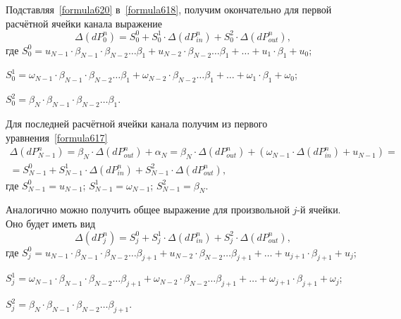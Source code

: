 Подставляя~\eqref{formula620} в~\eqref{formula618}, получим окончательно для первой расчётной ячейки канала выражение
\begin{equation}
\label{formula621}
\Delta(dP_0^n)=S_0^0 + S_0^1 \cdot \Delta(dP_{in}^n) + S_0^2 \cdot \Delta(dP_{out}^n),
\end{equation}  
где $S_0^0 = u_{N-1} \cdot \beta_{N-1} \cdot \beta_{N-2} \dots \beta_1 + u_{N-2} \cdot \beta_{N-2} \dots \beta_1 + \dots + u_1 \cdot \beta_1 + u_0$;

\noindent $S_0^1 = \omega_{N-1} \cdot \beta_{N-1} \cdot \beta_{N-2} \dots \beta_1 + \omega_{N-2} \cdot \beta_{N-2} \dots \beta_1 + \dots + \omega_1 \cdot \beta_1 + \omega_0$;

\noindent $S_0^2 = \beta_N \cdot \beta_{N-1} \cdot \beta_{N-2} \dots \beta_1$. 

Для последней расчётной ячейки канала получим из первого уравнения~\eqref{formula617}
\begin{eqnarray}
\label{formula622}
\Delta(dP_{N-1}^n)=\beta_N \cdot \Delta(dP_{out}^n) + \alpha_N = \beta_N \cdot \Delta(dP_{out}^n) + (\omega_{N-1} \cdot \Delta(dP_{in}^n) + u_{N-1}) = \nonumber ~\\
= S_{N-1}^0 + S_{N-1}^1 \cdot \Delta(dP_{in}^n) + S_{N-1}^2 \cdot \Delta(dP_{out}^n),
\end{eqnarray}
где $S_{N-1}^0 = u_{N-1}$; $S_{N-1}^1 = \omega_{N-1}$; $S_{N-1}^2 = \beta_N$. 

Аналогично можно получить общее выражение для произвольной $j$-й ячейки. Оно будет иметь вид
\begin{equation}
\label{formula623}
\Delta(dP_j^n)=S_j^0 + S_j^1 \cdot \Delta(dP_{in}^n) + S_j^2 \cdot \Delta(dP_{out}^n),
\end{equation} 
где $S_j^0 = u_{N-1} \cdot \beta_{N-1} \cdot \beta_{N-2} \dots \beta_{j+1} + u_{N-2} \cdot \beta_{N-2} \dots \beta_{j+1} + \dots + u_{j+1} \cdot \beta_{j+1} + u_j$;

\noindent $S_j^1 = \omega_{N-1} \cdot \beta_{N-1} \cdot \beta_{N-2} \dots \beta_{j+1} + \omega_{N-2} \cdot \beta_{N-2} \dots \beta_{j+1} + \dots + \omega_{j+1} \cdot \beta_{j+1} + \omega_j$;

\noindent $S_j^2 = \beta_N \cdot \beta_{N-1} \cdot \beta_{N-2} \dots \beta_{j+1}$.

